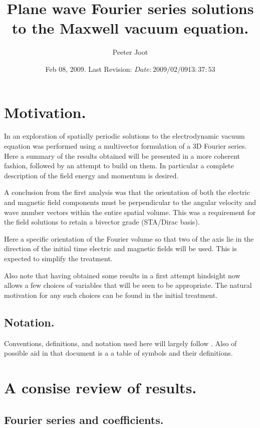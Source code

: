 \documentclass{article}
\title{ Plane wave Fourier series solutions to the Maxwell vacuum equation. }
\author{Peeter Joot}
\date{ Feb 08, 2009.  Last Revision: $Date: 2009/02/09 13:37:53 $ }
\begin{document}
\maketitle{}
\tableofcontents

\section{ Motivation. }

In \cite{PJFourierVacuum} an exploration of spatially periodic solutions to the electrodynamic vacuum equation was performed using a multivector formulation 
of a 3D Fourier series.
Here a summary of the results obtained will be presented in a more
coherent fashion, followed by an attempt to build on them.
In particular a complete
description of the field energy and momentum is desired.

A conclusion from the first analysis was that the
orientation of both the electric and magnetic field components
must be perpendicular to the angular velocity and wave number vectors 
within the entire spatial volume.  This was a requirement for the field
solutions to retain a bivector grade (STA/Dirac basis).

Here a specific orientation of the Fourier volume so that two of the axis
lie in the direction of the initial time electric and magnetic fields will be
used.  This is expected to simplify the treatment.

Also note that having obtained some results in a first attempt hindsight
now allows a few choices of variables that will be seen to be appropriate.
The natural motivation for any such choices can be found in the initial
treatment.

\subsection{ Notation. }

Conventions, definitions, and notation used here will largely follow
\cite{PJFourierVacuum}.  Also of possible aid in that document is a 
a table of symbols and their definitions.

\section{ A consise review of results. }

\subsection{ Fourier series and coefficients. }
\end{document}
